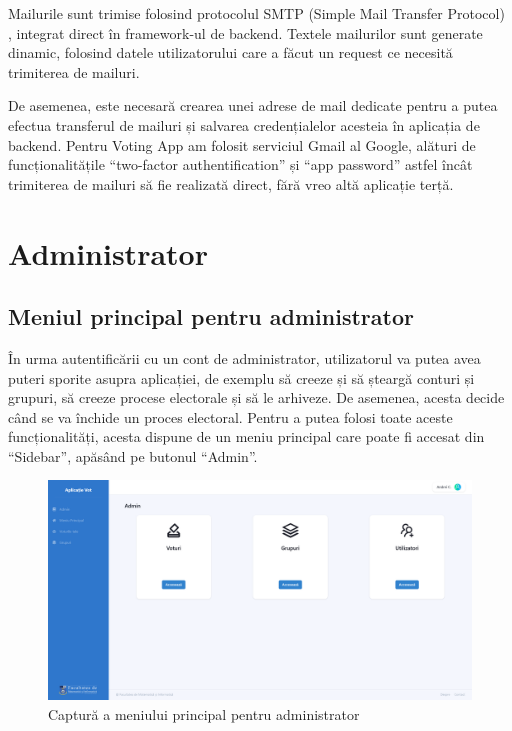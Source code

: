 Mailurile sunt trimise folosind protocolul SMTP (Simple Mail Transfer Protocol) \cite{what_is_smtp}, integrat direct în framework-ul de backend. Textele mailurilor sunt generate dinamic, folosind datele utilizatorului care a făcut un request ce necesită trimiterea de mailuri.

De asemenea, este necesară crearea unei adrese de mail dedicate pentru a putea efectua transferul de mailuri și salvarea credențialelor acesteia în aplicația de backend. Pentru Voting App am folosit serviciul Gmail al Google, alături de funcționalitățile \enquote{two-factor authentification} și \enquote{app password} astfel încât trimiterea de mailuri să fie realizată direct, fără vreo altă aplicație terță.

\newpage

\section{Administrator}

\subsection{Meniul principal pentru administrator}

În urma autentificării cu un cont de administrator, utilizatorul va putea avea puteri sporite asupra aplicației, de exemplu să creeze și să șteargă conturi și grupuri, să creeze procese electorale și să le arhiveze. De asemenea, acesta decide când se va închide un proces electoral. Pentru a putea folosi toate aceste funcționalități, acesta dispune de un meniu principal care poate fi accesat din \enquote{Sidebar}, apăsând pe butonul \enquote{Admin}.

\begin{figure}[!ht]
    \centering
    \includegraphics[width=135mm]{images/page_admin.png}
    \caption{Captură a meniului principal pentru administrator}
\end{figure}

